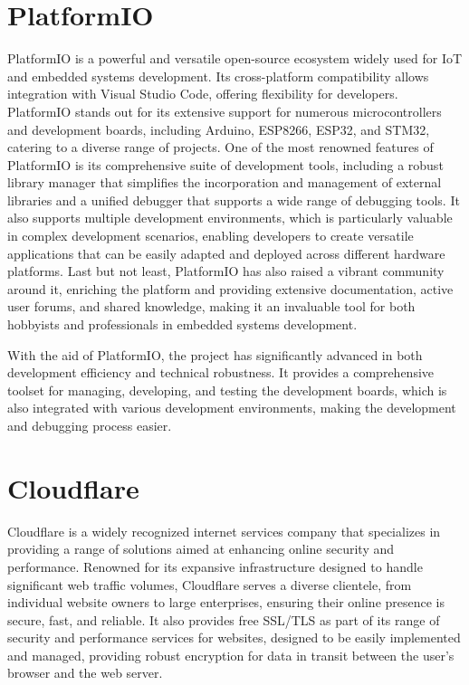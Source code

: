 \documentclass[../Main.tex]{subfiles}
\begin{document}
\section{PlatformIO}
PlatformIO is a powerful and versatile open-source ecosystem widely used for IoT and embedded systems development. Its cross-platform compatibility allows integration with Visual Studio Code, offering flexibility for developers. PlatformIO stands out for its extensive support for numerous microcontrollers and development boards, including Arduino, ESP8266, ESP32, and STM32, catering to a diverse range of projects. One of the most renowned features of PlatformIO is its comprehensive suite of development tools, including a robust library manager that simplifies the incorporation and management of external libraries and a unified debugger that supports a wide range of debugging tools. It also supports multiple development environments, which is particularly valuable in complex development scenarios, enabling developers to create versatile applications that can be easily adapted and deployed across different hardware platforms. Last but not least, PlatformIO has also raised a vibrant community around it, enriching the platform and providing extensive documentation, active user forums, and shared knowledge, making it an invaluable tool for both hobbyists and professionals in embedded systems development.

With the aid of PlatformIO, the project has significantly advanced in both development efficiency and technical robustness. It provides a comprehensive toolset for managing, developing, and testing the development boards, which is also integrated with various development environments, making the development and debugging process easier.

\section{Cloudflare}
Cloudflare is a widely recognized internet services company that specializes in providing a range of solutions aimed at enhancing online security and performance. Renowned for its expansive infrastructure designed to handle significant web traffic volumes, Cloudflare serves a diverse clientele, from individual website owners to large enterprises, ensuring their online presence is secure, fast, and reliable. It also provides free SSL/TLS as part of its range of security and performance services for websites, designed to be easily implemented and managed, providing robust encryption for data in transit between the user's browser and the web server. 
\end{document}
